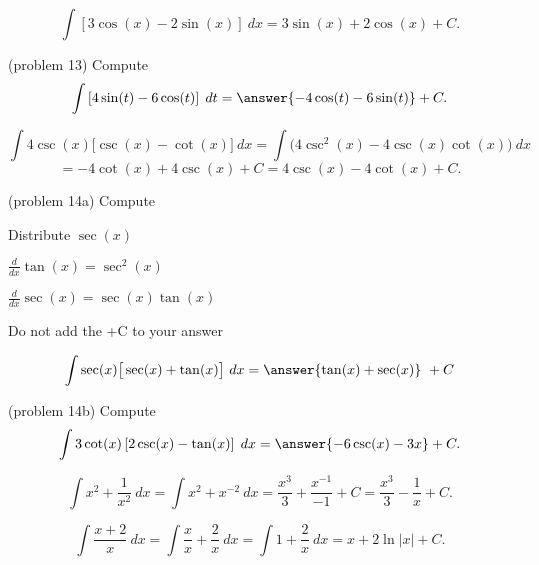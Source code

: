 \documentclass[handout]{ximera}
\begin{document}
\begin{example}[example 13]
\[
\int \left[3\cos(x) - 2\sin(x)\right] \ dx = 3\sin(x) + 2\cos(x) + C.
\]
\end{example}


\begin{problem}(problem 13)
Compute
\[
\int \left[4\sin(t) - 6\cos(t)\right] \; dt = \answer{-4\cos(t) - 6\sin(t)} + C.
\]
\end{problem}

\begin{example}[example 14]
\[
\int 4\csc(x)\big[\csc(x) - \cot(x)\big] \ dx = \int \big(4\csc^2(x)  - 4\csc(x)\cot(x)\big) \ dx
\]
\[
 = -4\cot(x) + 4\csc(x) + C
= 4\csc(x) - 4 \cot(x) + C.
\]
\end{example}



\begin{problem}(problem 14a)
Compute

\begin{hint}
Distribute $\sec(x)$
\end{hint}
\begin{hint}
$\frac{d}{dx} \tan(x) = \sec^2(x)$
\end{hint}
\begin{hint}
$\frac{d}{dx} \sec(x) = \sec(x)\tan(x)$
\end{hint}
\begin{hint}
\begin{center}
Do not add the +C to your answer
\end{center}
\end{hint}

\[
\int \sec(x)\big[\sec(x) + \tan(x) \big] \ dx =
\answer{\tan(x) + \sec(x)} \ +  C
\]
\end{problem}




\begin{problem}(problem 14b)
Compute
\[
\int 3\cot(x)\left[2\csc(x) - \tan(x)\right]\; dx = \answer{-6\csc(x) - 3x} + C.
\]
\end{problem}



\begin{example}[example 15]
\[
\int x^2 + \dfrac{1}{x^2} \ dx = \int x^2 + x^{-2} \ dx = \dfrac{x^3}{3} + \dfrac{x^{-1}}{-1} + C 
= \dfrac{x^3}{3} - \dfrac{1}{x} + C.
\]

\end{example}


\begin{example}[example 16]
\[
\int \dfrac{x+2}{x} \ dx = \int \dfrac{x}{x} + \dfrac{2}{x} \ dx = \int 1 + \dfrac{2}{x} \ dx = x + 2\ln|x| +C.
\]

\end{example}
\end{document}
